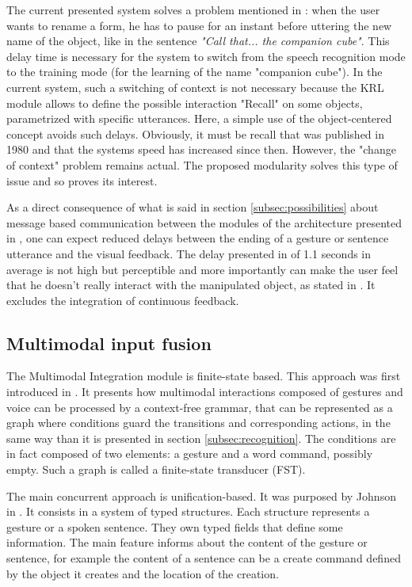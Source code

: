 \documentclass[a4paper]{article}
\begin{document}
The current presented system solves a problem mentioned in \cite{putthatthere}: when the user wants to rename a form, he has to pause for an instant before uttering the new name of the object, like in the sentence \textit{"Call that... the companion cube"}. This delay time is necessary for the system to switch from the speech recognition mode to the training mode (for the learning of the name "companion cube"). In the current system, such a switching of context is not necessary because the KRL module allows to define the possible interaction "Recall" on some objects, parametrized with specific utterances. Here, a simple use of the object-centered concept avoids such delays. Obviously, it must be recall that \cite{putthatthere} was published in 1980 and that the systems speed has increased since then. However, the "change of context" problem remains actual. The proposed modularity solves this type of issue and so proves its interest.

As a direct consequence of what is said in section \ref{subsec:possibilities} about message based communication between the modules of the architecture presented in \cite{kaiser}, one can expect reduced delays between the ending of a gesture or sentence utterance and the visual feedback. The delay presented in \cite{kaiser} of 1.1 seconds in average is not high but perceptible and more importantly can make the user feel that he doesn't really interact with the manipulated object, as stated in \cite{responsetime}. It excludes the integration of continuous feedback.

\subsection{Multimodal input fusion}

The Multimodal Integration module is finite-state based. This approach was first introduced in \cite{state-based}. It presents how multimodal interactions composed of gestures and voice can be processed by a context-free grammar, that can be represented as a graph where conditions guard the transitions and corresponding actions, in the same way than it is presented in section \ref{subsec:recognition}. The conditions are in fact composed of two elements: a gesture and a word command, possibly empty. Such a graph is called a finite-state transducer (FST).

The main concurrent approach is unification-based. It was purposed by Johnson in \cite{unification-based}. It consists in a system of typed structures. Each structure represents a gesture or a spoken sentence. They own typed fields that define some information. The main feature informs about the content of the gesture or sentence, for example the content of a sentence can be a create command defined by the object it creates and the location of the creation.
\end{document}
